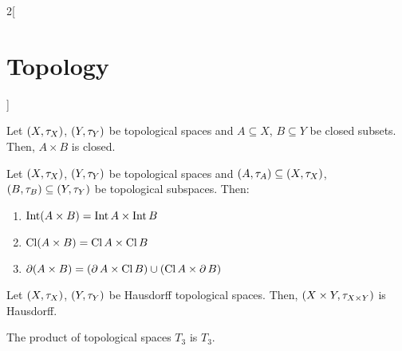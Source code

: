 \documentclass[../../../main.tex]{subfiles}
\begin{document}
\begin{multicols}{2}[\section{Topology}]
\begin{prop}
    \end{prop}
    \begin{prop}
        Let $(X,\tau_X)$, $(Y,\tau_Y)$ be topological spaces and $A\subseteq X$, $B\subseteq Y$ be closed subsets. Then, $A\times B$ is closed.
    \end{prop}
    \begin{prop}
        Let $(X,\tau_X)$, $(Y,\tau_Y)$ be topological spaces and $(A,\tau_A)\subseteq (X,\tau_X)$, $(B,\tau_B)\subseteq (Y,\tau_Y)$ be topological subspaces. Then:
        \begin{enumerate}
            \item $\operatorname{Int}(A\times B)=\operatorname{Int} A\times \operatorname{Int} B$
            \item $\operatorname{Cl}(A\times B)=\operatorname{Cl} A\times \operatorname{Cl} B$
            \item $\operatorname{\partial}(A\times B)=(\operatorname{\partial} A\times\operatorname{Cl} B)\cup(\operatorname{Cl} A\times \operatorname{\partial} B)$
        \end{enumerate}
    \end{prop}
    \begin{prop}
        Let $(X,\tau_X)$, $(Y,\tau_Y)$ be Hausdorff topological spaces. Then, $(X\times Y,\tau_{X\times Y})$ is Hausdorff.
    \end{prop}
    \begin{theorem}
        The product of topological spaces $T_3$ is $T_3$.
    \end{theorem}

\end{multicols}
\end{document}
